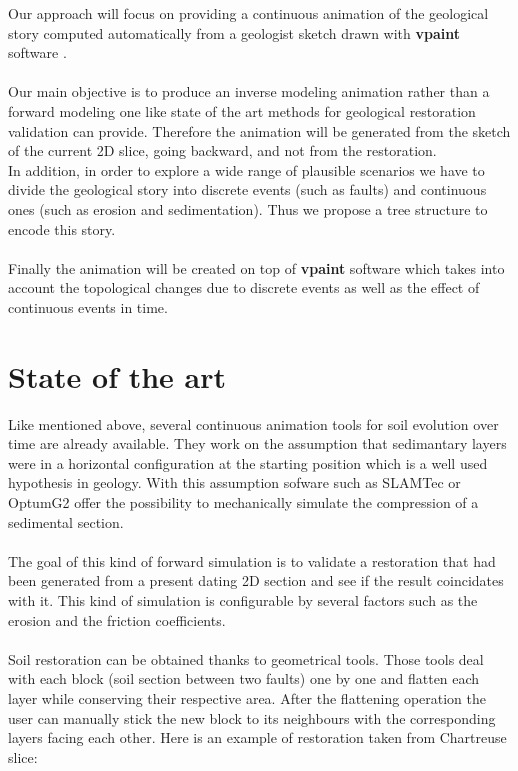 \documentclass[a4paper,11pt]{article}
\begin{document}
Our approach will focus on providing a continuous animation of the geological story computed automatically from a geologist sketch drawn with \textbf{vpaint} software \cite{vpaint}. \\\\
Our main objective is to produce an inverse modeling animation rather than a forward modeling one like state of the art methods for geological restoration validation can provide. Therefore the animation will be generated from the sketch of the current 2D slice, going backward, and not from the restoration.\\
In addition, in order to explore a wide range of plausible scenarios we have to divide the geological story into discrete events (such as faults) and continuous ones (such as erosion and sedimentation). Thus we propose a tree structure to encode this story.\\\\
Finally the animation will be created on top of \textbf{vpaint} software which takes into account the topological changes due to discrete events as well as the effect of continuous events in time.

\section{State of the art}

Like mentioned above, several continuous animation tools for soil evolution over time are already available.
They work on the assumption that sedimantary layers were in a horizontal configuration at the starting position which is a well used hypothesis in geology. 
With this assumption sofware such as SLAMTec or OptumG2 offer the possibility to mechanically simulate the compression of a sedimental section.\\\\
The goal of this kind of forward simulation is to validate a restoration that had been generated from a present dating 2D section and see if the result coincidates with it. This kind of simulation is configurable by several factors such as the erosion and the friction coefficients.\\\\
Soil restoration can be obtained thanks to geometrical tools. Those tools deal with each block (soil section between two faults) one by one and flatten each layer while conserving their respective area. After the flattening operation the user can manually stick the new block to its neighbours with the corresponding layers facing each other. 
Here is an example of restoration taken from Chartreuse slice:
\end{document}
